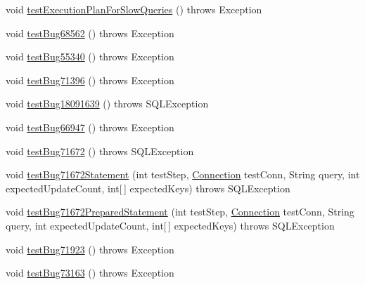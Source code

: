 \begin{DoxyCompactItemize}
\item 
void \mbox{\hyperlink{classtestsuite_1_1regression_1_1_statement_regression_test_a48e3f759b34396e94ab7bf59872d5604}{test\+Execution\+Plan\+For\+Slow\+Queries}} ()  throws Exception 
\item 
void \mbox{\hyperlink{classtestsuite_1_1regression_1_1_statement_regression_test_a98f77aa1cdaf8554dcfff5b368c4e90a}{test\+Bug68562}} ()  throws Exception 
\item 
void \mbox{\hyperlink{classtestsuite_1_1regression_1_1_statement_regression_test_ad893290c719e6320a980acdd172851e7}{test\+Bug55340}} ()  throws Exception 
\item 
void \mbox{\hyperlink{classtestsuite_1_1regression_1_1_statement_regression_test_a716338573789cf539312a6527ddd2ea6}{test\+Bug71396}} ()  throws Exception 
\item 
void \mbox{\hyperlink{classtestsuite_1_1regression_1_1_statement_regression_test_a01b6dcfb6870df0348d9c1fb80efe81c}{test\+Bug18091639}} ()  throws S\+Q\+L\+Exception 
\item 
void \mbox{\hyperlink{classtestsuite_1_1regression_1_1_statement_regression_test_a222cfacd79b9dcf61c6ebefe3966ede7}{test\+Bug66947}} ()  throws Exception 
\item 
void \mbox{\hyperlink{classtestsuite_1_1regression_1_1_statement_regression_test_ab1d12cefc8598fc6b119554ddfe01866}{test\+Bug71672}} ()  throws S\+Q\+L\+Exception 
\item 
void \mbox{\hyperlink{classtestsuite_1_1regression_1_1_statement_regression_test_abb13639717a457989454d73d4dbc02b8}{test\+Bug71672\+Statement}} (int test\+Step, \mbox{\hyperlink{interfacecom_1_1mysql_1_1jdbc_1_1_connection}{Connection}} test\+Conn, String query, int expected\+Update\+Count, int\mbox{[}$\,$\mbox{]} expected\+Keys)  throws S\+Q\+L\+Exception 
\item 
void \mbox{\hyperlink{classtestsuite_1_1regression_1_1_statement_regression_test_ac89b52220f4a7d1e808940f72f5887c1}{test\+Bug71672\+Prepared\+Statement}} (int test\+Step, \mbox{\hyperlink{interfacecom_1_1mysql_1_1jdbc_1_1_connection}{Connection}} test\+Conn, String query, int expected\+Update\+Count, int\mbox{[}$\,$\mbox{]} expected\+Keys)  throws S\+Q\+L\+Exception 
\item 
void \mbox{\hyperlink{classtestsuite_1_1regression_1_1_statement_regression_test_a3676f906ace9714006ad7a71ab1e4211}{test\+Bug71923}} ()  throws Exception 
\item 
void \mbox{\hyperlink{classtestsuite_1_1regression_1_1_statement_regression_test_ae5f07756a16c505fbd7fb497fcf9f601}{test\+Bug73163}} ()  throws Exception 

\end{DoxyCompactItemize}
